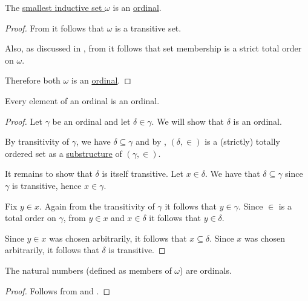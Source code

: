 \begin{proposition}\label{thm:omega_is_an_ordinal}
  The \hyperref[thm:smallest_inductive_set_existence_existence]{smallest inductive set \( \omega \)} is an \hyperref[def:ordinal]{ordinal}.
\end{proposition}
\begin{proof}
  From  it follows that \( \omega \) is a transitive set.

  Also, as discussed in , from  it follows that set membership is a strict total order on \( \omega \).

  Therefore both \( \omega \) is an \hyperref[def:ordinal]{ordinal}.
\end{proof}

\begin{proposition}\label{thm:element_of_ordinal_is_ordinal}
  Every element of an ordinal is an ordinal.
\end{proposition}
\begin{proof}
  Let \( \gamma \) be an ordinal and let \( \delta \in \gamma \). We will show that \( \delta \) is an ordinal.

  By transitivity of \( \gamma \), we have \( \delta \subseteq \gamma \) and by , \( (\delta, \in) \) is a (strictly) totally ordered set as a \hyperref[def:first_order_substructure]{substructure} of \( (\gamma, \in) \).

  It remains to show that \( \delta \) is itself transitive. Let \( x \in \delta \). We have that \( \delta \subseteq \gamma \) since \( \gamma \) is transitive, hence \( x \in \gamma \).

  Fix \( y \in x \). Again from the transitivity of \( \gamma \) it follows that \( y \in \gamma \). Since \( \in \) is a total order on \( \gamma \), from \( y \in x \) and \( x \in \delta \) it follows that \( y \in \delta \).

  Since \( y \in x \) was chosen arbitrarily, it follows that \( x \subseteq \delta \). Since \( x \) was chosen arbitrarily, it follows that \( \delta \) is transitive.
\end{proof}

\begin{corollary}\label{thm:natural_numbers_are_ordinals}
  The natural numbers (defined as members of \hyperref[thm:smallest_inductive_set_existence]{\( \omega \)}) are ordinals.
\end{corollary}
\begin{proof}
  Follows from  and .
\end{proof}

